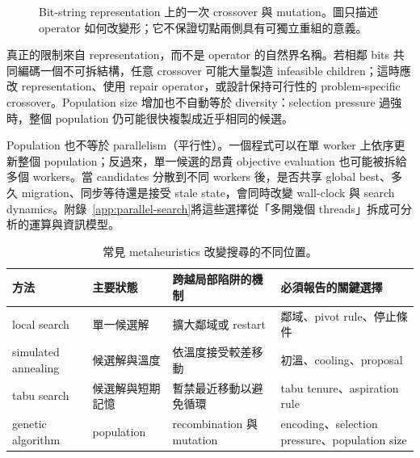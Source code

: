 \documentclass[11pt,a4paper,oneside,openany]{book}
\begin{document}
\begin{figure}[htbp]
\centering
{}
\caption{Bit-string representation 上的一次 crossover 與 mutation。圖只描述 operator 如何改變形；它不保證切點兩側具有可獨立重組的意義。}
\label{fig:ga-operators}
\end{figure}

 真正的限制來自 representation，而不是 operator 的自然界名稱。若相鄰 bits 共同編碼一個不可拆結構，任意 crossover 可能大量製造 infeasible children；這時應改 representation、使用 repair operator，或設計保持可行性的 problem-specific crossover。Population size 增加也不自動等於 diversity：selection pressure 過強時，整個 population 仍可能很快複製成近乎相同的候選。

Population 也不等於 parallelism（平行性）。一個程式可以在單 worker 上依序更新整個 population；反過來，單一候選的昂貴 objective evaluation 也可能被拆給多個 workers。當 candidates 分散到不同 workers 後，是否共享 global best、多久 migration、同步等待還是接受 stale state，會同時改變 wall-clock 與 search dynamics。附錄~\ref{app:parallel-search}將這些選擇從「多開幾個 threads」拆成可分析的運算與資訊模型。

\begin{table}[htbp]
\centering
\caption{常見 metaheuristics 改變搜尋的不同位置。}
\begin{tabularx}{\textwidth}{@{}lYYY@{}}
\toprule
方法 & 主要狀態 & 跨越局部陷阱的機制 & 必須報告的關鍵選擇 \\
\midrule
local search & 單一候選解 & 擴大鄰域或 restart & 鄰域、pivot rule、停止條件 \\
simulated annealing & 候選解與溫度 & 依溫度接受較差移動 & 初溫、cooling、proposal \\
tabu search & 候選解與短期記憶 & 暫禁最近移動以避免循環 & tabu tenure、aspiration rule \\
genetic algorithm & population & recombination 與 mutation & encoding、selection pressure、population size \\
\bottomrule
\end{tabularx}
\label{tab:meta-methods}
\end{table}
\end{document}
